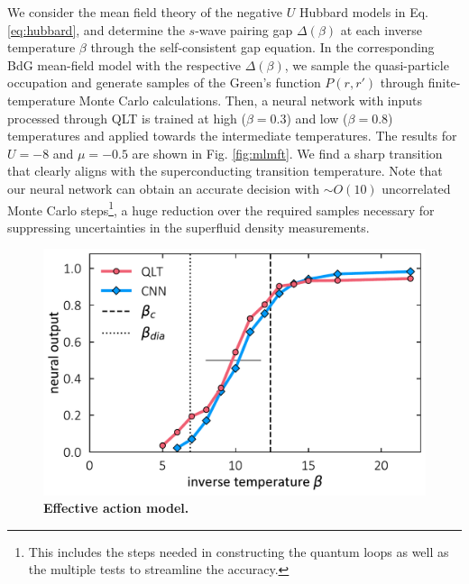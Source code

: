 \documentclass[amsmath,amssymb, aps, prl, twocolumn]{revtex4-1}
\begin{document}
We consider the mean field theory of the negative $U$ Hubbard models in Eq. \ref{eq:hubbard}, and determine the $s$-wave pairing gap $\Delta(\beta)$ at each inverse temperature $\beta$ through the self-consistent gap equation. In the corresponding BdG mean-field model with the respective $\Delta(\beta)$, we sample the quasi-particle occupation and generate samples of the Green's function $P(r,r')$ through finite-temperature Monte Carlo calculations. Then, a neural network with inputs processed through QLT is trained at  high ($\beta=0.3$) and low ($\beta=0.8$) temperatures and applied towards the intermediate temperatures. The results for $U=-8$ and $\mu=-0.5$ are shown in Fig. \ref{fig:mlmft}. We find a sharp transition that clearly aligns with the superconducting transition temperature. Note that our neural network can obtain an accurate decision with $\sim O(10)$ uncorrelated Monte Carlo steps\footnote{This includes the steps needed in constructing the quantum loops as well as the multiple tests to streamline the accuracy.}, a huge reduction over the required samples necessary for suppressing uncertainties in the superfluid density measurements\cite{Hong2016, Erez2016}. 

\begin{figure}
\includegraphics[scale=.43]{fig3.pdf}
\caption{{\bf Effective action model.}}
\label{fig:afmetal}
\end{figure}
\end{document}

